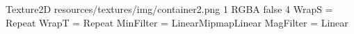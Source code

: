 Texture2D
resources/textures/img/container2.png
1
RGBA
false
4
WrapS = Repeat
WrapT = Repeat
MinFilter = LinearMipmapLinear
MagFilter = Linear